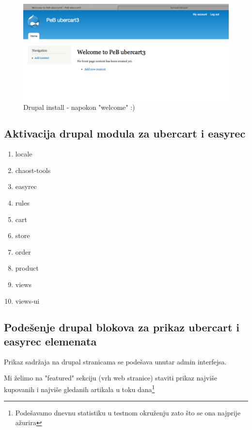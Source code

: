 \documentclass[times, utf8, seminar]{fit}
\begin{document}
{{{\begin{figure}[H]
\centering
\includegraphics[width=12cm]{img/drupal_welcome.png}
\caption{Drupal install - napokon "welcome" :)}
\end{figure}

\subsection{Aktivacija drupal modula za ubercart i easyrec}

\begin{enumerate}
\item locale
\item chaost-tools
\item easyrec
\item rules
\item cart
\item store
\item order
\item product
\item views
\item views-ui
\end{enumerate}

\subsection{Podešenje drupal blokova za prikaz ubercart i easyrec elemenata}

Prikaz sadržaja na drupal stranicama se podešava unutar admin interfejsa.

Mi želimo na "featured" sekciju (vrh web stranice) staviti prikaz najviše kupovanih i najviše gledanih artikala u toku dana\footnote{Podešavamo dnevnu statistiku u testnom okruženju zato što se ona najprije ažurira}

}}}
\end{document}
